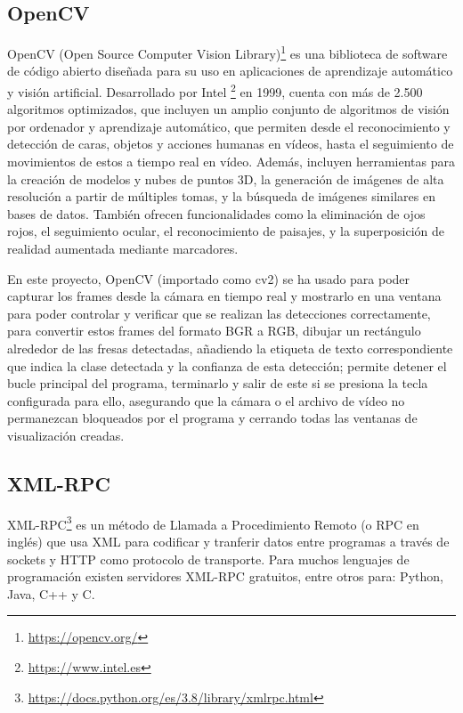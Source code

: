 \subsection{OpenCV}
\label{sec:OpenCV}

OpenCV (Open Source Computer Vision Library)\footnote{\url{https://opencv.org/}} es una biblioteca de software de código abierto diseñada para su uso en aplicaciones de aprendizaje automático y visión artificial. Desarrollado por Intel \footnote{\url{https://www.intel.es}} en 1999, cuenta con más de 2.500 algoritmos optimizados, que incluyen un amplio conjunto de algoritmos de visión por ordenador y aprendizaje automático, que permiten desde el reconocimiento y detección de caras, objetos y acciones humanas en vídeos, hasta el seguimiento de movimientos de estos a tiempo real en vídeo. Además, incluyen herramientas para la creación de modelos y nubes de puntos 3D, la generación de imágenes de alta resolución a partir de múltiples tomas, y la búsqueda de imágenes similares en bases de datos. También ofrecen funcionalidades como la eliminación de ojos rojos, el seguimiento ocular, el reconocimiento de paisajes, y la superposición de realidad aumentada mediante marcadores.

En este proyecto, OpenCV (importado como cv2) se ha usado para poder capturar los frames desde la cámara en tiempo real y mostrarlo en una ventana para poder controlar y verificar que se realizan las detecciones correctamente, para convertir estos frames del formato BGR a RGB, dibujar un rectángulo alrededor de las fresas detectadas, añadiendo la etiqueta de texto correspondiente que indica la clase detectada y la confianza de esta detección; permite detener el bucle principal del programa, terminarlo y salir de este si se presiona la tecla configurada para ello, asegurando que la cámara o el archivo de vídeo no permanezcan bloqueados por el programa y cerrando todas las ventanas de visualización creadas.
\pagebreak

\subsection{XML-RPC}
\label{sec:XMLRPC}

XML-RPC\footnote{\url{https://docs.python.org/es/3.8/library/xmlrpc.html}} es un método de Llamada a Procedimiento Remoto (o RPC en inglés) que usa XML para codificar y tranferir datos entre programas a través de sockets y HTTP como protocolo de transporte. Para muchos lenguajes de programación existen servidores XML-RPC gratuitos, entre otros para: Python, Java, C++ y C.


